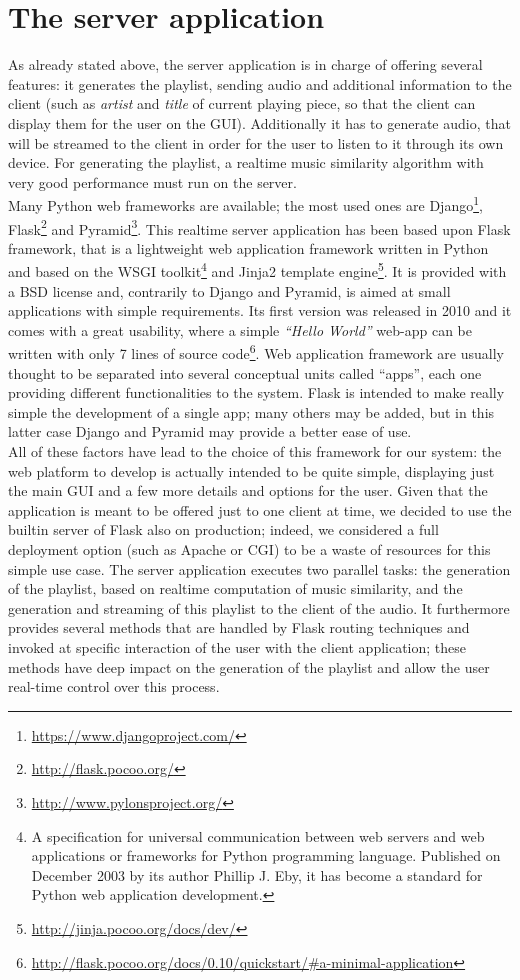 \section{The server application}
\label{sec:rtserver}
As already stated above, the server application is in charge of offering several features: it generates the playlist, sending audio and additional information to the client (such as \textit{artist} and \textit{title} of current playing piece, so that the client can display them for the user on the GUI). Additionally it has to generate audio, that will be streamed to the client in order for the user to listen to it through its own device. For generating the playlist, a realtime music similarity algorithm with very good performance must run on the server. \\ Many Python web frameworks are available; the most used ones are Django\footnote{\url{https://www.djangoproject.com/}}, Flask\footnote{\url{http://flask.pocoo.org/}} and Pyramid\footnote{\url{http://www.pylonsproject.org/}}. This realtime server application has been based upon Flask framework, that is a lightweight web application framework written in Python and based on the WSGI toolkit\footnote{A specification for universal communication between web servers and web applications or frameworks for Python programming language. Published on December 2003 by its author Phillip J. Eby, it has become a standard for Python web application development.} and Jinja2 template engine\footnote{\url{http://jinja.pocoo.org/docs/dev/}}. It is provided with a BSD license and, contrarily to Django and Pyramid, is aimed at small applications with simple requirements. Its first version was released in 2010 and it comes with a great usability, where a simple \textit{``Hello World''} web-app can be written with only 7 lines of source code\footnote{\url{http://flask.pocoo.org/docs/0.10/quickstart/#a-minimal-application}}. Web application framework are usually thought to be separated into several conceptual units called ``apps'', each one providing different functionalities to the system. Flask is intended to make really simple the development of a single app; many others may be added, but in this latter case Django and Pyramid may provide a better ease of use. \\ All of these factors have lead to the choice of this framework for our system: the web platform to develop is actually intended to be quite simple, displaying just the main GUI and a few more details and options for the user. Given that the application is meant to be offered just to one client at time, we decided to use the builtin server of Flask also on production; indeed, we considered a full deployment option (such as Apache or CGI) to be a waste of resources for this simple use case. The server application executes two parallel tasks: the generation of the playlist, based on realtime computation of music similarity, and the generation and streaming of this playlist to the client of the audio. It furthermore provides several methods that are handled by Flask routing techniques and invoked at specific interaction of the user with the client application; these methods have deep impact on the generation of the playlist and allow the user real-time control over this process. 


